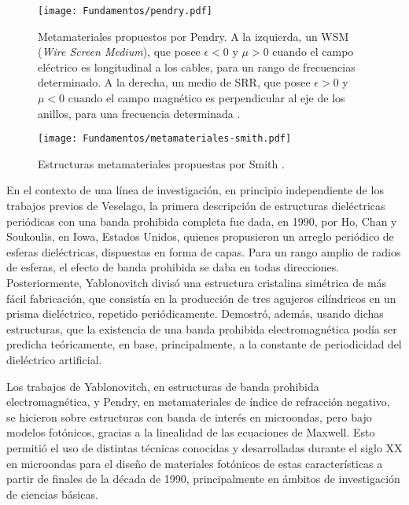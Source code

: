 \begin{figure}[htp]
	\centering
	\texttt{[image: Fundamentos/pendry.pdf]}
	\caption{Metamateriales propuestos por Pendry. A la izquierda, un WSM (\textit{Wire Screen Medium}), que posee $\epsilon<0$ y $\mu>0$ cuando el campo eléctrico es longitudinal a los cables, para un rango de frecuencias determinado. A la derecha, un medio de SRR, que posee $\epsilon>0$ y $\mu<0$ cuando el campo magnético es perpendicular al eje de los anillos, para una frecuencia determinada \cite{Caloz:ElectromagneticMetamaterials}.}
	\label{fig:Pendry}
\end{figure}

\begin{figure}[htp]
	\centering
	\texttt{[image: Fundamentos/metamateriales-smith.pdf]}
	\caption{Estructuras metamateriales propuestas por Smith \cite{Caloz:ElectromagneticMetamaterials}.}
	\label{fig:metamaterial-de-smith}
\end{figure}

En el contexto de una línea de investigación, en principio independiente de los trabajos previos de Veselago, la primera descripción de estructuras dieléctricas periódicas con una banda prohibida completa fue dada, en 1990, por Ho, Chan y Soukoulis, en Iowa, Estados Unidos, quienes propusieron un arreglo periódico de esferas dieléctricas, dispuestas en forma de capas. Para un rango amplio de radios de esferas, el efecto de banda prohibida se daba en todas direcciones. Posteriormente, Yablonovitch divisó una estructura cristalina simétrica de más fácil fabricación, que consistía en la producción de tres agujeros cilíndricos en un prisma dieléctrico, repetido periódicamente. Demostró, además, usando dichas estructuras, que la existencia de una banda prohibida electromagnética podía ser predicha teóricamente, en base, principalmente, a la constante de periodicidad del dieléctrico artificial.

Los trabajos de Yablonovitch, en estructuras de banda prohibida electromagnética, y Pendry, en metamateriales de índice de refracción negativo, se hicieron sobre estructuras con banda de interés en microondas, pero bajo modelos fotónicos, gracias a la linealidad de las ecuaciones de Maxwell. Esto permitió el uso de distintas técnicas conocidas y desarrolladas durante el siglo XX en microondas para el diseño de materiales fotónicos de estas características a partir de finales de la década de 1990, principalmente en ámbitos de investigación de ciencias básicas.

